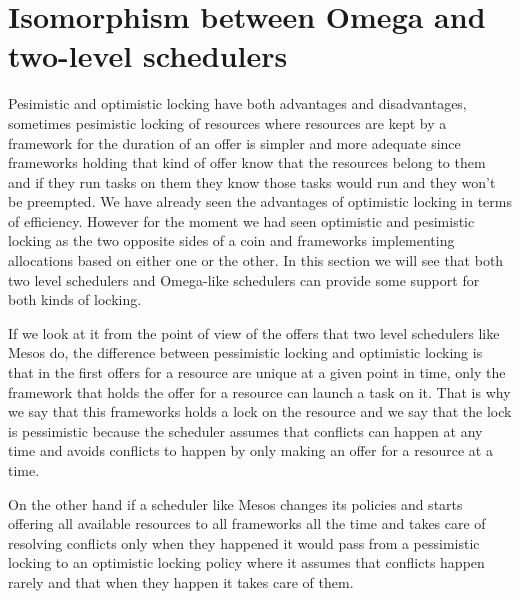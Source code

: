 \documentclass{svjour3}                     %
\begin{document}


\section {Isomorphism between Omega and two-level schedulers}
\label{sec:mixed}

Pesimistic and optimistic locking have both advantages and
disadvantages, sometimes pesimistic locking of resources where
resources are kept by a framework for the duration of an offer is
simpler and more adequate since frameworks holding that kind of offer
know that the resources belong to them and if they run tasks on them
they know those tasks would run and they won't be preempted. We have
already seen the advantages of optimistic locking in terms of
efficiency. However for the moment we had seen optimistic and
pesimistic locking as the two opposite sides of a coin and frameworks
implementing allocations based on either one or the other. In this
section we will see that both two level schedulers and Omega-like
schedulers can provide some support for both kinds of locking.

If we look at it from the point of view of the offers that two level
schedulers like Mesos do, the difference between pessimistic locking
and optimistic locking is that in the first offers for a resource are
unique at a given point in time, only the framework that holds the
offer for a resource can launch a task on it. That is why we say that
this frameworks holds a lock on the resource and we say that the lock
is pessimistic because the scheduler assumes that conflicts can happen
at any time and avoids conflicts to happen by only making an offer for
a resource at a time.

On the other hand if a scheduler like Mesos changes its policies and
starts offering all available resources to all frameworks all the time
and takes care of resolving conflicts only when they happened it would
pass from a pessimistic locking to an optimistic locking policy where
it assumes that conflicts happen rarely and that when they happen it
takes care of them.
\end{document}
